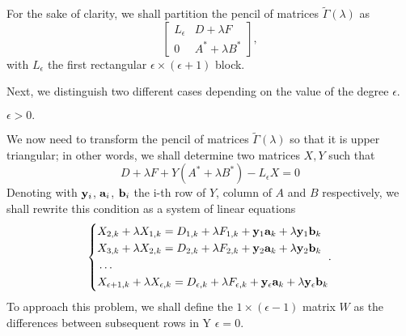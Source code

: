 For the sake of clarity, we shall partition the pencil of matrices \(\tilde{\Gamma}(\lambda)\) as
\[
    \begin{bmatrix}
        L_{\epsilon} & D + \lambda F \\
        0 & A^{*} + \lambda B^{*}
    \end{bmatrix},
\]
with \(L_{\epsilon}\) the first rectangular \(\epsilon \times (\epsilon + 1)\) block.

Next, we distinguish two different cases depending on the value of the degree \(\epsilon\).
\begin{cs}
    \case \(\epsilon > 0.\)

    We now need to transform the pencil of matrices \(\tilde{\Gamma}(\lambda)\) so that it is upper triangular;
    in other words, we shall determine two matrices \(X, Y\) such that
    \[
        D + \lambda F + Y(A^{*} + \lambda B^{*}) - L_{\epsilon}X = 0
    \]
    Denoting with \(\vb{y}_{i}\), \(\vb{a}_{i}\), \(\vb{b}_{i}\) the i-th row of \(Y\), column of \(A\) and
    \(B\) respectively, we shall rewrite this condition as a system of linear equations
    \begin{equation*}
        \left\{
            \begin{aligned}
                & X_{2, k} + \lambda X_{1, k} = D_{1, k} + \lambda F_{1, k} + \vb{y}_{1}\vb{a}_{k} +
                    \lambda \vb{y}_{1}\vb{b}_{k} \\
                & X_{3, k} + \lambda X_{2, k} = D_{2, k} + \lambda F_{2, k} + \vb{y}_{2}\vb{a}_{k} +
                    \lambda \vb{y}_{2}\vb{b}_{k} \\
                & \hdots \\
                & X_{\epsilon+1, k} + \lambda X_{\epsilon, k} =
                    D_{\epsilon, k} + \lambda F_{\epsilon, k} + \vb{y}_{\epsilon}\vb{a}_{k} +
                    \lambda \vb{y}_{\epsilon}\vb{b}_{k} \\
            \end{aligned}.
        \right.
    \end{equation*}
    To approach this problem, we shall define the \(1 \times (\epsilon - 1)\) matrix \(W\) as the differences between
    subsequent rows in Y
    \case \(\epsilon = 0.\)
\end{cs}